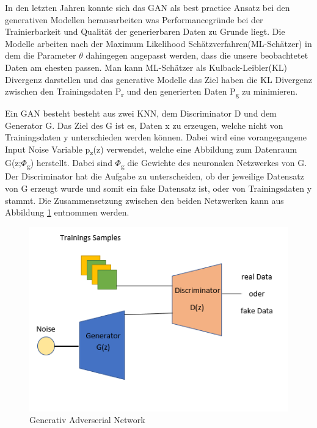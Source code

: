 \documentclass{llncs}
\begin{document}
In den letzten Jahren konnte sich das GAN als best practice Ansatz bei den generativen Modellen herausarbeiten was Performancegründe bei der Trainierbarkeit und Qualität der generierbaren Daten zu Grunde liegt\cite{Grundlagen}. 
Die Modelle arbeiten nach der Maximum Likelihood Schätzverfahren(ML-Schätzer) in dem die Parameter $\theta$ dahingegen angepasst werden, dass die unsere beobachtetet Daten am ehesten passen. Man kann ML-Schätzer als Kulback-Leibler(KL) Divergenz darstellen und das generative Modelle das Ziel haben die KL Divergenz zwischen den Trainingsdaten P\textsubscript{r} und den generierten Daten P\textsubscript{g} zu minimieren.

Ein GAN besteht besteht aus zwei KNN, dem Discriminator D und dem Generator G. Das Ziel des G ist es, Daten x zu erzeugen, welche nicht von Trainingsdaten y unterschieden werden können. Dabei wird eine vorangegangene Input Noise Variable p\textsubscript{z}(z) verwendet, welche eine Abbildung zum Datenraum G(z;$\Phi$\textsubscript{g}) herstellt. Dabei sind $\Phi$\textsubscript{g} die Gewichte des neuronalen Netzwerkes von G. Der Discriminator hat die Aufgabe zu unterscheiden, ob der jeweilige Datensatz von G erzeugt wurde und somit ein fake Datensatz ist, oder von Trainingsdaten y stammt\cite{goodfellow2014}. Die Zusammensetzung zwischen den beiden Netzwerken kann aus Abbildung \ref{fig:Bild20} entnommen werden.
\\
\begin{figure}[htbp] 
	\centering
	\includegraphics[width=1.0\textwidth]{GAN_GRUNDAUFBAU.png}
	\caption{Generativ Adverserial Network}
	\label{fig:Bild20}
\end{figure}
\end{document}
